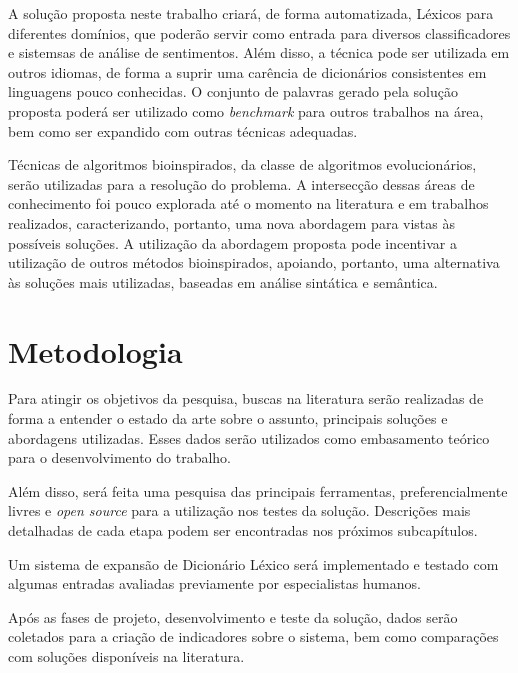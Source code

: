 \documentclass[a4paper,11pt]{article}
\begin{document}
A solução proposta neste trabalho criará, de forma automatizada, Léxicos para diferentes domínios, que poderão servir como entrada para diversos classificadores e sistemsas de análise de sentimentos. Além disso, a técnica pode ser utilizada em outros idiomas, de forma a suprir uma carência de dicionários consistentes em linguagens pouco conhecidas.
O conjunto de palavras gerado pela solução proposta poderá ser utilizado como \emph{benchmark} para outros trabalhos na área, bem como ser expandido com outras técnicas adequadas.

Técnicas de algoritmos bioinspirados, da classe de algoritmos evolucionários, serão utilizadas para a resolução do problema. A intersecção dessas áreas de conhecimento foi pouco explorada até o momento na literatura e em trabalhos realizados, caracterizando, portanto, uma nova abordagem para vistas às possíveis soluções. A utilização da abordagem proposta pode incentivar a utilização de outros métodos bioinspirados, apoiando, portanto, uma alternativa às soluções mais utilizadas, baseadas em análise sintática e semântica.

\section{Metodologia}
\label{sec:met}
Para atingir os objetivos da pesquisa, buscas na literatura serão realizadas de forma a entender o estado da arte sobre o assunto, principais soluções e abordagens utilizadas. Esses dados serão utilizados como embasamento teórico para o desenvolvimento do trabalho. 

Além disso, será feita uma pesquisa das principais ferramentas, preferencialmente livres e \emph{open source} para a utilização nos testes da solução. Descrições mais detalhadas de cada etapa podem ser encontradas nos próximos subcapítulos.

Um sistema de expansão de Dicionário Léxico será implementado e testado com algumas entradas avaliadas previamente por especialistas humanos.

Após as fases de projeto, desenvolvimento e teste da solução, dados serão coletados para a criação de indicadores sobre o sistema, bem como comparações com soluções disponíveis na literatura.
\end{document}
